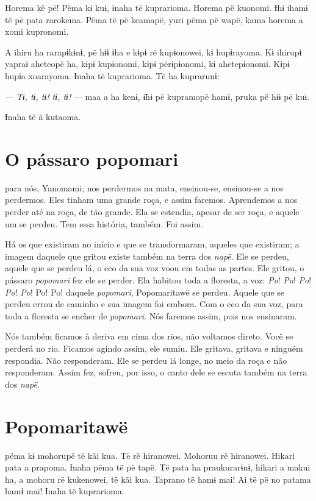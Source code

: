 Horema kë pë! Pëma kɨ kuɨ, ɨnaha të kuprarioma. Horema pë kuonomi. Ɨhɨ
ihamɨ të pë pata rarokema. Pëma të pë keamapë, yuri pëma pë wapë, kama
horema a xomi kupronomi. 

A ihiru ha rarapɨkɨnɨ, pë hɨɨ ɨha e kɨpɨ rë kupɨonowei, kɨ hupɨrayoma.
Kɨ ihirupɨ yapraɨ aheteopë ha, kɨpɨ kupɨonomi, kɨpɨ përɨpɨonomi, kɨ
ahetepɨonomi. Kɨpɨ hupɨa xoarayoma. Ɨnaha të kuprarioma. Të ha
kuprarunɨ: 

--- \textit{Tɨ, tɨ, tɨ! tɨ, tɨ!} --- maa a ha kenɨ, ɨ̃hɨ pë kupramopë hamɨ, pruka
pë hɨɨ pë kuɨ. 

Ɨnaha të ã kutaoma.

\chapter{O pássaro popomari}

 para nós, Yanomami; nos perdermos na mata, ensinou-se,
ensinou-se a nos perdermos. Eles tinham uma grande roça, e assim faremos.
Aprendemos a nos perder até na roça, de tão grande. Ela se estendia, apesar
de ser roça, e aquele um se perdeu. Tem essa história, também. Foi assim. 

Há os que existiram no início e que se transformaram, aqueles que
existiram; a imagem daquele que gritou existe também na terra
dos \textit{napë}. Ele se perdeu, aquele que se perdeu lá, o eco da sua
voz voou em todas as partes. Ele gritou, o pássaro \textit{popomari} fez
ele se perder. Ela habitou toda a floresta, a voz: \textit{Po}! \textit{Po}! \textit{Po}! \textit{Po}! \textit{Po}!
Po! Po! daquele \textit{popomari}, Popomaritawë se perdeu. Aquele que se
perdeu errou de caminho e sua imagem foi embora. Com o eco da sua voz,
para toda a floresta se encher de \textit{popomari}. Nós faremos assim,
pois nos ensinaram. 

Nós também ficamos à deriva em cima dos rios, não voltamos direto. Você se
perderá no rio. Ficamos agindo assim, ele sumiu. Ele gritava, gritava e
ninguém respondia. Não responderam. Ele se perdeu lá longe, no meio da
roça e não responderam. Assim fez, sofreu, por isso, o canto dele se
escuta também na terra dos \textit{napë}.

\chapter{Popomaritawë}
 
 pëma kɨ mohorupë të kãi kua. Të rë hiranowei. Mohoruu rë
hiranowei. Hikari pata a prapoma. Ɨnaha pëma të pë tapë. Të pata ha
praukurarɨnɨ, hikari a makui ha, a mohoru rë kukenowei, të kãi kua.
Taprano të hamɨ mai! Ai të pë no patama hamɨ mai! Ɨnaha të kuprarioma. 

